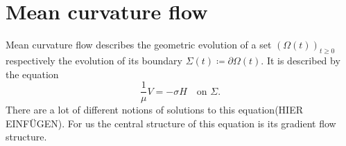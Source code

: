 \section{Mean curvature flow}

Mean curvature flow describes the geometric evolution of a set $ ( \Omega ( t ) )_{ t \geq 0 } $ respectively the evolution of its boundary $ \Sigma ( t ) \coloneqq \partial \Omega ( t ) $. It is described by the equation
\begin{equation*}
	\frac{ 1 }{ \mu } V = - \sigma H 
	\quad
	\text{on }
	\Sigma.
\end{equation*}
There are a lot of different notions of solutions to this equation(HIER EINFÜGEN).
For us the central structure of this equation is its gradient flow structure. 
